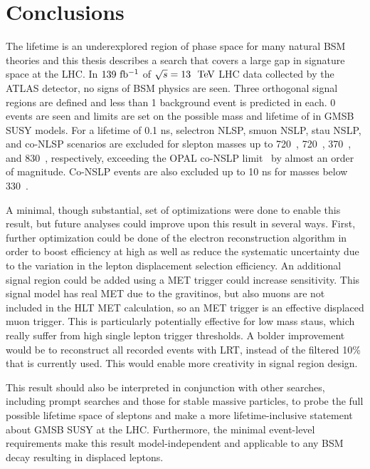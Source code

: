 \chapter{Conclusions}
\label{chap:conclusions}

The lifetime is an underexplored region of phase space for many natural \ac{BSM} theories and this thesis describes a search that covers a large gap in signature space at the \ac{LHC}. In $139~ \mbox{fb\(^{-1}\)}$ of $\sqrt{s} = 13~\TeV$ \ac{LHC} data collected by the \ac{ATLAS} detector, no signs of \ac{BSM} physics are seen. Three orthogonal signal regions are defined and less than 1 background event is predicted in each. 0 events are seen and limits are set on the possible mass and lifetime of \slep in \ac{GMSB} \ac{SUSY} models. For a lifetime of 0.1 ns, selectron NLSP, smuon NSLP, stau NSLP, and co-NLSP scenarios are excluded for slepton masses up to 720~\GeV, 720~\GeV, 370~\GeV, and 830~\GeV, respectively, exceeding the OPAL co-NSLP limit~\cite{opal} by almost an order of magnitude. Co-NSLP events are also excluded up to 10 ns for masses below 330~\GeV.

A minimal, though substantial, set of optimizations were done to enable this result, but future analyses could improve upon this result in several ways. First, further optimization could be done of the electron reconstruction algorithm in order to boost efficiency at high \absdz as well as reduce the systematic uncertainty due to the variation in the lepton displacement selection efficiency. An additional signal region could be added using a \ac{MET} trigger could increase sensitivity. This signal model has real \ac{MET} due to the gravitinos, but also muons are not included in the \ac{HLT} \ac{MET} calculation, so an \ac{MET} trigger is an effective displaced muon trigger. This is particularly potentially effective for low mass staus, which really suffer from high single lepton trigger \pt thresholds. A bolder improvement would be to reconstruct all recorded events with \ac{LRT}, instead of the filtered 10\% that is currently used. This would enable more creativity in signal region design.

This result should also be interpreted in conjunction with other searches, including prompt searches and those for stable massive particles, to probe the full possible lifetime space of sleptons and make a more lifetime-inclusive statement about \ac{GMSB} \ac{SUSY} at the \ac{LHC}. Furthermore, the minimal event-level requirements make this result model-independent and applicable to any \ac{BSM} decay resulting in displaced leptons.
